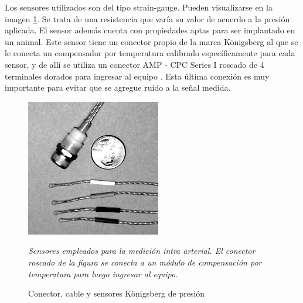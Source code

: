 Los sensores utilizados son del tipo strain-gauge. Pueden visualizarse en la imagen \ref{fig:konigsberg}. Se trata de una resistencia que varía su valor de acuerdo a la presión aplicada. El sensor además cuenta con propiedades aptas para ser implantado en un animal. Este sensor tiene un conector propio de la marca Königsberg al que se le conecta un compensador por temperatura calibrado específicamente para cada sensor, y de allí se utiliza un conector AMP - CPC Series I roscado de 4 terminales dorados para ingresar al equipo \citep{conectores2007}. Esta última conexión es muy importante para evitar que se agregue ruido a la señal medida.

\begin{figure}[!htbp]
	\centering
	
	\begin{minipage}{0.65\textwidth}
		\includegraphics[width=\textwidth]{./Figures/konigsberg.jpeg}
		{\footnotesize \textit{Sensores empleados para la medición intra arterial. El conector roscado de la figura se conecta a un módulo de compensación por temperatura para luego ingresar al equipo.}\par}		
	\end{minipage}		
		
	\caption{Conector, cable y sensores Königsberg de presión}
	\label{fig:konigsberg}
\end{figure}

